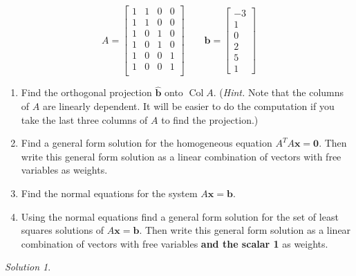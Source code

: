 \documentclass{article}
\newcommand{\vv}[1]{\mathbf{#1}}
\DeclareMathOperator{\col}{Col}
\theoremstyle{remark}
\newtheorem*{solution}{Solution}
\begin{document}
\begin{displaymath}
  A =
  \begin{bmatrix}
    1 & 1 & 0 & 0 \\
    1 & 1 & 0 & 0 \\
    1 & 0 & 1 & 0 \\
    1 & 0 & 1 & 0 \\
    1 & 0 & 0 & 1 \\
    1 & 0 & 0 & 1 \\
  \end{bmatrix}
  \qquad
  \vv b =
  \begin{bmatrix}
    -3 \\ 1 \\ 0 \\ 2 \\ 5 \\ 1
  \end{bmatrix}
\end{displaymath}
\begin{enumerate}
\item Find the orthogonal projection $\hat{\vv b}$ onto $\col A$. (\textit{Hint.} Note that the columns of $A$ are linearly dependent. It will be easier to do the computation if you take the last three columns of $A$ to find the projection.)
\item Find a general form solution for the homogeneous equation $A^TA\vv x = \vv 0$. Then write this general form solution as a linear combination of vectors with free variables as weights.
\item Find the normal equations for the system $A\vv x = \vv b$.
\item Using the normal equations find a general form solution for the set of least squares solutions of $A\vv x = \vv b$. Then write this general form solution as a linear combination of vectors with free variables \textbf{and the scalar 1} as weights.
\end{enumerate}
\medskip

\begin{solution}
\end{solution}
\end{document}
